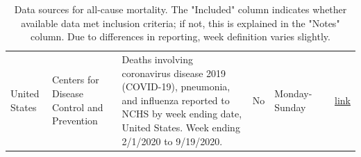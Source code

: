 \documentclass[
]{article}
\begin{document}
\begin{landscape}
\begin{table}[]
\begin{tabular}{p{.5in}p{1.5in}p{2in}p{1in}p{1.5in}p{1in}p{.5in}}
United States    & Centers for Disease Control and Prevention                                                                                                                           & Deaths involving coronavirus disease 2019   (COVID-19), pneumonia, and influenza reported to NCHS by week ending date,   United States. Week ending 2/1/2020 to 9/19/2020. & No                & Monday-Sunday                                            &                                                                          & \href{https://www.cdc.gov/nchs/nvss/vsrr/covid19/index.htm}{link}                                                                                                                                                                                                                                              
                        
\end{tabular}
\caption{Data sources for all-cause mortality.  The "Included" column indicates whether available data met inclusion criteria; if not, this is explained in the "Notes" column.  Due to differences in reporting, week definition varies slightly.}
\label{tbl1}
\end{table}

\end{landscape}

\bigskip
\end{document}
